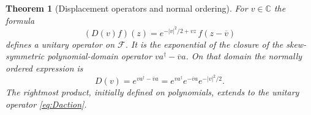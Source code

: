 \documentclass[11pt]{article}
\newtheorem{theorem}{Theorem}[section]
\theoremstyle{definition}
\theoremstyle{remark}
\newcommand{\C}{\mathbb C}
\numberwithin{equation}{section}
\begin{document}
\begin{theorem}[Displacement operators and normal ordering]\label{thm:displacement}
For $v\in\C$ the formula
\begin{equation}\label{eq:Daction}
 (D(v)f)(z)=e^{-|v|^2/2+vz}\,f(z-\overline v)
\end{equation}
defines a unitary operator on $\mathcal F$. It is the exponential of the closure of the skew-symmetric polynomial-domain operator $va^\dagger-\overline v a$. On that domain the normally ordered expression is
\begin{equation}\label{eq:normalorder}
 D(v)=e^{va^\dagger-\overline v a}
     =e^{va^\dagger}e^{-\overline v a}e^{-|v|^2/2}.
\end{equation}
The rightmost product, initially defined on polynomials, extends to the unitary operator \eqref{eq:Daction}.
\end{theorem}
\end{document}

